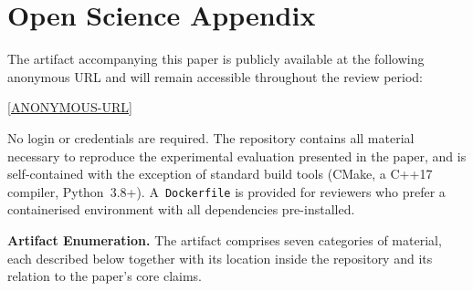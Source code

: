 
\section{Open Science Appendix}

The artifact accompanying this paper is publicly available at the following
anonymous URL and will remain accessible throughout the review period:
%
\begin{center}
  \url{[ANONYMOUS-URL]}
\end{center}
%
No login or credentials are required.
The repository contains all material necessary to reproduce the
experimental evaluation presented in the paper, and is self-contained
with the exception of standard build tools (CMake, a C++17 compiler,
Python~3.8+).
A~\texttt{Dockerfile} is provided for reviewers who prefer a
containerised environment with all dependencies pre-installed.

\smallskip
\noindent\textbf{Artifact Enumeration.}
The artifact comprises seven categories of material, each described below
together with its location inside the repository and its relation to the
paper's core claims.

